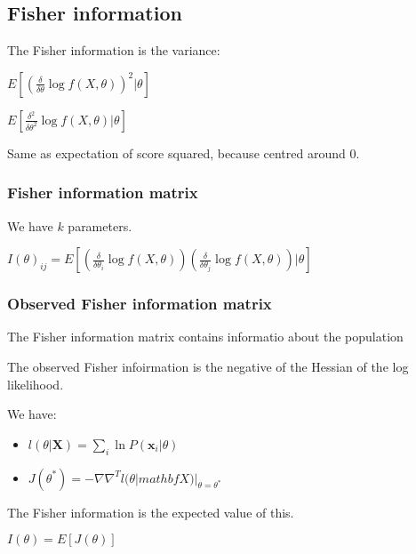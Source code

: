 
\subsection{Fisher information}

The Fisher information is the variance:

\(E[(\frac{\delta }{\delta \theta }\log f(X, \theta ))^2 |\theta ]\)

\(E[\frac{\delta^2 }{\delta \theta^2 }\log f(X, \theta ) |\theta ]\)

Same as expectation of score squared, because centred around \(0\).

\subsubsection{Fisher information matrix}

We have \(k\) parameters.

\(I(\theta )_{ij}=E[(\frac{\delta }{\delta \theta_i}\log f(X, \theta ))(\frac{\delta }{\delta \theta_j }\log f(X, \theta ))|\theta ]\)

\subsubsection{Observed Fisher information matrix}

The Fisher information matrix contains informatio about the population

The observed Fisher infoirmation is the negative of the Hessian of the log likelihood.

We have:

\begin{itemize}
\item \(l(\theta |\mathbf X)=\sum_i\ln P(\mathbf x_i|\theta )\)
\item \(J(\theta^*)=-\nabla \nabla^Tl(\theta|mathbf X )|_{\theta = \theta^*}\)
\end{itemize}

The Fisher information is the expected value of this.

\(I(\theta )=E[J(\theta)]\)


